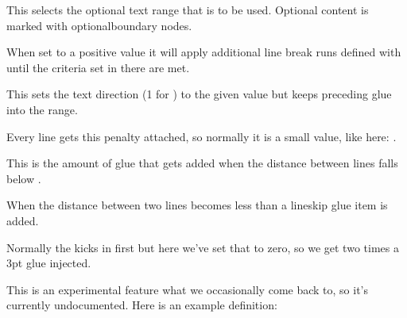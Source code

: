 This selects the optional text range that is to be used. Optional content is
marked with {optionalboundary} nodes.

\stopnewprimitive

\startnewprimitive[title={\prm {linebreakpasses}}]

When set to a positive value it will apply additional line break runs defined
with  until the criteria set in there are met.

\stopnewprimitive

\startnewprimitive[title={\prm {linedirection}}]

This sets the text direction (1 for ) to the given value but keeps
preceding glue into the range.

\stopnewprimitive

\startoldprimitive[title={\prm {linepenalty}}]

Every line gets this penalty attached, so normally it is a small value, like
here: \the \linepenalty.

\stopoldprimitive

\startoldprimitive[title={\prm {lineskip}}]

This is the amount of glue that gets added when the distance between lines falls
below .

\stopoldprimitive

\startoldprimitive[title={\prm {lineskiplimit}}]

When the distance between two lines becomes less than  a \prm
{lineskip} glue item is added.

\startbuffer
{}
\stopbuffer

\typebuffer

Normally the  kicks in first but here we've set that to zero,
so we get two times a 3pt glue injected.

\startlocallinecorrection
\getbuffer
\stoplocallinecorrection

\stopoldprimitive

\startnewprimitive[title={\prm {linesnapping}}]

This is an experimental feature what we occasionally come back to, so it's
currently undocumented. Here is an example definition:

\starttyping
{}

